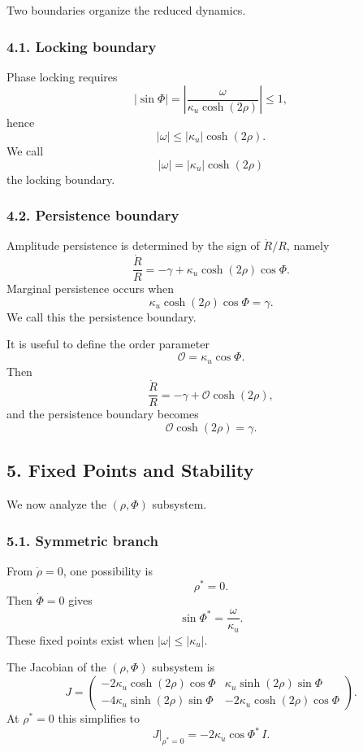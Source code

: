 \documentclass[
]{article}
\begin{document}
Two boundaries organize the reduced dynamics.

\subsubsection{4.1. Locking boundary}\label{locking-boundary}

Phase locking requires \[
|\sin\Phi| = \left|\frac{\omega}{\kappa_{u} \cosh(2\rho)}\right| \le 1,
\] hence \[
|\omega| \le |\kappa_{u}| \cosh(2\rho).
\] We call \[
|\omega| = |\kappa_{u}| \cosh(2\rho)
\] the locking boundary.

\subsubsection{4.2. Persistence boundary}\label{persistence-boundary}

Amplitude persistence is determined by the sign of \(\dot{R}/R\), namely
\[
\frac{\dot{R}}{R} = -\gamma + \kappa_{u}\cosh(2\rho)\cos\Phi.
\] Marginal persistence occurs when \[
\kappa_{u}\cosh(2\rho)\cos\Phi = \gamma.
\] We call this the persistence boundary.

It is useful to define the order parameter \[
\mathcal{O} = \kappa_{u} \cos\Phi.
\] Then \[
\frac{\dot{R}}{R} = -\gamma + \mathcal{O}\cosh(2\rho),
\] and the persistence boundary becomes \[
\mathcal{O}\cosh(2\rho) = \gamma.
\]

\subsection{5. Fixed Points and
Stability}\label{fixed-points-and-stability}

We now analyze the \((\rho,\Phi)\) subsystem.

\subsubsection{5.1. Symmetric branch}\label{symmetric-branch}

From \(\dot{\rho} = 0\), one possibility is \[
\rho^* = 0.
\] Then \(\dot{\Phi}=0\) gives \[
\sin\Phi^* = \frac{\omega}{\kappa_{u}}.
\] These fixed points exist when \(|\omega| \le |\kappa_{u}|\).

The Jacobian of the \((\rho,\Phi)\) subsystem is \[
J =
\begin{pmatrix}
-2\kappa_{u}\cosh(2\rho)\cos\Phi & \kappa_{u}\sinh(2\rho)\sin\Phi \\
-4\kappa_{u}\sinh(2\rho)\sin\Phi & -2\kappa_{u}\cosh(2\rho)\cos\Phi
\end{pmatrix}.
\] At \(\rho^*=0\) this simplifies to \[
J|_{\rho^*=0}
= -2\kappa_{u}\cos\Phi^* \, I.
\]
\end{document}
